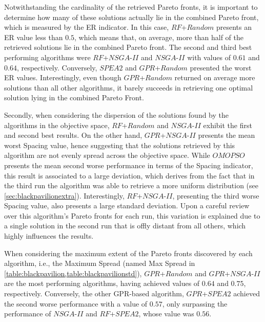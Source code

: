 Notwithstanding the cardinality of the retrieved Pareto fronts, it is important to determine how many of these solutions actually lie in the combined Pareto front, which is measured by the \ac{ER} indicator. In this case, $RF$+$Random$ presents an \ac{ER} value less than $0.5$, which means that, on average, more than half of the retrieved solutions lie in the combined Pareto front. The second and third best performing algorithms were $RF$+$NSGA$-$II$ and $NSGA$-$II$ with values of $0.61$ and $0.64$, respectively. Conversely, $SPEA2$ and $GPR$+$Random$ presented the worst \ac{ER} values. Interestingly, even though $GPR$+$Random$ returned on average more solutions than all other algorithms, it barely succeeds in retrieving one optimal solution lying in the combined Pareto Front.

Secondly, when considering the dispersion of the solutions found by the algorithms in the objective space, $RF$+$Random$ and $NSGA$-$II$ exhibit the first and second best results. On the other hand, $GPR$+$NSGA$-$II$ presents the mean worst Spacing value, hence suggesting that the solutions retrieved by this algorithm are not evenly spread across the objective space. While $OMOPSO$ presents the mean second worse performance in terms of the Spacing indicator, this result is associated to a large deviation, which derives from the fact that in the third run the algorithm was able to retrieve a more uniform distribution (see \cref{sec:blackpavilionextra}). Interestingly, $RF$+$NSGA$-$II$, presenting the third worse Spacing value, also presents a large standard deviation. Upon a careful review over this algorithm's Pareto fronts for each run, this variation is explained due to a single solution in the second run that is offly distant from all others, which highly influences the results. 

When considering the maximum extent of the Pareto fronts discovered by each algorithm, i.e., the Maximum Spread (named Max Spread in \cref{table:blackpavilion,table:blackpavilionstd}), $GPR$+$Random$ and $GPR$+$NSGA$-$II$ are the most performing algorithms, having achieved values of $0.64$ and $0.75$, respectively. Conversely, the other \ac{GPR}-based algorithm, $GPR$+$SPEA2$ achieved the second worse performance with a value of $0.57$, only surpassing the performance of $NSGA$-$II$ and $RF$+$SPEA2$, whose value was $0.56$. 

